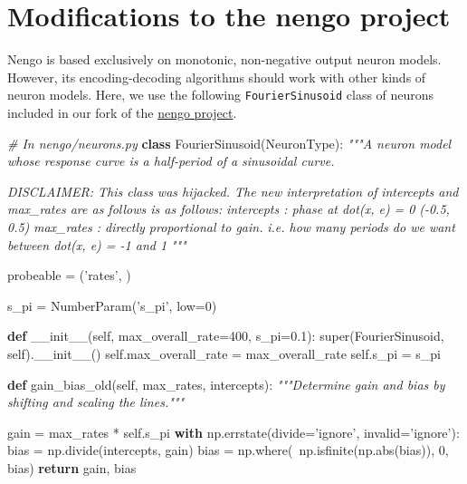 \documentclass{report}
\newenvironment{Shaded}{}{}
\newcommand{\KeywordTok}[1]{\textcolor[rgb]{0.00,0.44,0.13}{\textbf{{#1}}}}
\newcommand{\DecValTok}[1]{\textcolor[rgb]{0.25,0.63,0.44}{{#1}}}
\newcommand{\FloatTok}[1]{\textcolor[rgb]{0.25,0.63,0.44}{{#1}}}
\newcommand{\StringTok}[1]{\textcolor[rgb]{0.25,0.44,0.63}{{#1}}}
\newcommand{\CommentTok}[1]{\textcolor[rgb]{0.38,0.63,0.69}{\textit{{#1}}}}
\newcommand{\FunctionTok}[1]{\textcolor[rgb]{0.02,0.16,0.49}{{#1}}}
\newcommand{\NormalTok}[1]{{#1}}
\newcommand{\VariableTok}[1]{\textcolor[rgb]{0.10,0.09,0.49}{{#1}}}
\newcommand{\ControlFlowTok}[1]{\textcolor[rgb]{0.00,0.44,0.13}{\textbf{{#1}}}}
\newcommand{\OperatorTok}[1]{\textcolor[rgb]{0.40,0.40,0.40}{{#1}}}
\newcommand{\BuiltInTok}[1]{{#1}}
\begin{document}
\section{Modifications to the nengo
project}\label{modifications-to-the-nengo-project}

Nengo is based exclusively on monotonic, non-negative output neuron
models. However, its encoding-decoding algorithms should work with other
kinds of neuron models. Here, we use the following
\texttt{FourierSinusoid} class of neurons included in our fork of the
\href{https://github.com/nengo/nengo/}{nengo project}.

\begin{Shaded}
\begin{Highlighting}[]
\CommentTok{# In nengo/neurons.py}
\KeywordTok{class}\NormalTok{ FourierSinusoid(NeuronType):}
    \CommentTok{"""A neuron model whose response curve is a half-period of a}
\CommentTok{    sinusoidal curve.}

\CommentTok{    DISCLAIMER: This class was hijacked. The new interpretation of}
\CommentTok{    intercepts and max_rates are as follows is as follows:}
\CommentTok{    intercepts : phase at dot(x, e) = 0}
\CommentTok{        (-0.5, 0.5)}
\CommentTok{    max_rates : directly proportional to gain.}
\CommentTok{        i.e. how many periods do we want between dot(x, e) = -1 and 1}
\CommentTok{    """}

\NormalTok{    probeable }\OperatorTok{=}\NormalTok{ (}\StringTok{'rates'}\NormalTok{, )}

\NormalTok{    s_pi }\OperatorTok{=}\NormalTok{ NumberParam(}\StringTok{'s_pi'}\NormalTok{, low}\OperatorTok{=}\DecValTok{0}\NormalTok{)}

    \KeywordTok{def} \FunctionTok{__init__}\NormalTok{(}\VariableTok{self}\NormalTok{, max_overall_rate}\OperatorTok{=}\DecValTok{400}\NormalTok{, s_pi}\OperatorTok{=}\FloatTok{0.1}\NormalTok{):}
        \BuiltInTok{super}\NormalTok{(FourierSinusoid, }\VariableTok{self}\NormalTok{).}\FunctionTok{__init__}\NormalTok{()}
        \VariableTok{self}\NormalTok{.max_overall_rate }\OperatorTok{=}\NormalTok{ max_overall_rate}
        \VariableTok{self}\NormalTok{.s_pi }\OperatorTok{=}\NormalTok{ s_pi}

    \KeywordTok{def}\NormalTok{ gain_bias_old(}\VariableTok{self}\NormalTok{, max_rates, intercepts):}
        \CommentTok{"""Determine gain and bias by shifting and scaling the lines."""}

\NormalTok{        gain }\OperatorTok{=}\NormalTok{ max_rates }\OperatorTok{*} \VariableTok{self}\NormalTok{.s_pi}
        \ControlFlowTok{with}\NormalTok{ np.errstate(divide}\OperatorTok{=}\StringTok{'ignore'}\NormalTok{, invalid}\OperatorTok{=}\StringTok{'ignore'}\NormalTok{):}
\NormalTok{            bias }\OperatorTok{=}\NormalTok{ np.divide(intercepts, gain)}
\NormalTok{        bias }\OperatorTok{=}\NormalTok{ np.where(}\OperatorTok{~}\NormalTok{np.isfinite(np.}\BuiltInTok{abs}\NormalTok{(bias)), }\DecValTok{0}\NormalTok{, bias)}
        \ControlFlowTok{return}\NormalTok{ gain, bias}


\end{Highlighting}
\end{Shaded}
\end{document}
